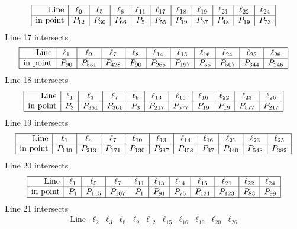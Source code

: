 \documentclass{article}
\begin{document}
{$$\begin{array}{|r*{10}{|c}|}
\hline
\mbox{Line}  & \ell_{0} & \ell_{5} & \ell_{6} & \ell_{11} & \ell_{17} & \ell_{18} & \ell_{19} & \ell_{21} & \ell_{22} & \ell_{24}\\
\hline
\mbox{in point}  & P_{12} & P_{30} & P_{66} & P_{5} & P_{55} & P_{19} & P_{37} & P_{48} & P_{19} & P_{73}\\
\hline
\end{array}
$$
Line 17 intersects 
$$
\begin{array}{|r*{10}{|c}|}
\hline
\mbox{Line}  & \ell_{1} & \ell_{2} & \ell_{7} & \ell_{8} & \ell_{14} & \ell_{15} & \ell_{16} & \ell_{24} & \ell_{25} & \ell_{26}\\
\hline
\mbox{in point}  & P_{90} & P_{551} & P_{428} & P_{90} & P_{266} & P_{197} & P_{55} & P_{507} & P_{344} & P_{246}\\
\hline
\end{array}
$$
Line 18 intersects 
$$
\begin{array}{|r*{10}{|c}|}
\hline
\mbox{Line}  & \ell_{1} & \ell_{3} & \ell_{7} & \ell_{9} & \ell_{13} & \ell_{15} & \ell_{16} & \ell_{22} & \ell_{23} & \ell_{26}\\
\hline
\mbox{in point}  & P_{3} & P_{361} & P_{361} & P_{3} & P_{217} & P_{577} & P_{19} & P_{19} & P_{577} & P_{217}\\
\hline
\end{array}
$$
Line 19 intersects 
$$
\begin{array}{|r*{10}{|c}|}
\hline
\mbox{Line}  & \ell_{1} & \ell_{4} & \ell_{7} & \ell_{10} & \ell_{13} & \ell_{14} & \ell_{16} & \ell_{21} & \ell_{23} & \ell_{25}\\
\hline
\mbox{in point}  & P_{130} & P_{213} & P_{171} & P_{130} & P_{287} & P_{458} & P_{37} & P_{440} & P_{548} & P_{382}\\
\hline
\end{array}
$$
Line 20 intersects 
$$
\begin{array}{|r*{10}{|c}|}
\hline
\mbox{Line}  & \ell_{1} & \ell_{5} & \ell_{7} & \ell_{11} & \ell_{13} & \ell_{14} & \ell_{15} & \ell_{21} & \ell_{22} & \ell_{24}\\
\hline
\mbox{in point}  & P_{1} & P_{115} & P_{107} & P_{1} & P_{91} & P_{75} & P_{131} & P_{123} & P_{83} & P_{99}\\
\hline
\end{array}
$$
Line 21 intersects 
$$
\begin{array}{|r*{10}{|c}|}
\hline
\mbox{Line}  & \ell_{2} & \ell_{3} & \ell_{8} & \ell_{9} & \ell_{12} & \ell_{15} & \ell_{16} & \ell_{19} & \ell_{20} & \ell_{26}\\

\end{array}$$}
\end{document}
